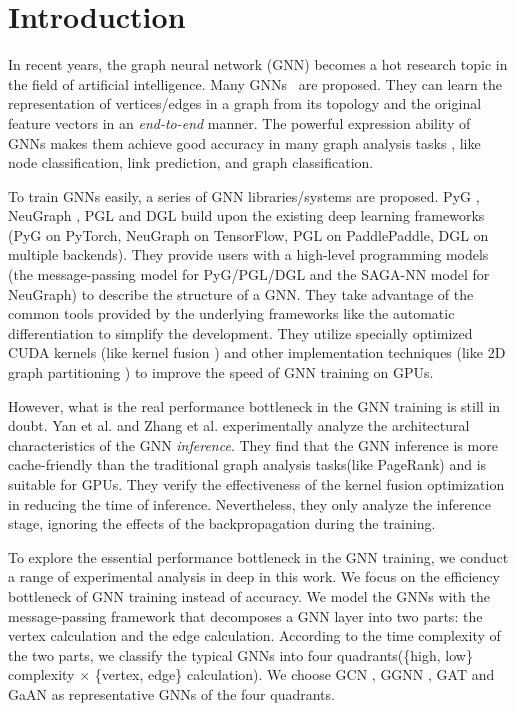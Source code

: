 \section{Introduction}
In recent years, the graph neural network (GNN) becomes a hot research topic in the field of artificial intelligence.
Many GNNs~\cite{kipf2017_gcn, defferrad2016_chebnet, li2018_agcn,li2015_ggnn, hamilton2017_graphsage, huang2018_gat, zhang2018_gaan} are proposed.
They can learn the representation of vertices/edges in a graph from its topology and the original feature vectors in an \emph{end-to-end} manner.
The powerful expression ability of GNNs makes them achieve good accuracy in many graph analysis tasks \cite{zhou2018_gnn_review, zhang2018_gnn_survey, comprehensive-survey-wu-2020}, like node classification, link prediction, and graph classification.

To train GNNs easily, a series of GNN libraries/systems \cite{PyG, DGL, ma2019_neugraph, zhu2019_aligraph, PGL} are proposed.
PyG \cite{PyG}, NeuGraph \cite{ma2019_neugraph}, PGL \cite{PGL} and DGL \cite{DGL} build upon the existing deep learning frameworks (PyG on PyTorch, NeuGraph on TensorFlow, PGL on PaddlePaddle, DGL on multiple backends).
They provide users with a high-level programming models (the message-passing model for PyG/PGL/DGL and the SAGA-NN model for NeuGraph) to describe the structure of a GNN.
They take advantage of the common tools provided by the underlying frameworks like the automatic differentiation to simplify the development.
They utilize specially optimized CUDA kernels (like kernel fusion \cite{DGL} \cite{ma2019_neugraph}) and other implementation techniques (like 2D graph partitioning \cite{ma2019_neugraph}) to improve the speed of GNN training on GPUs.

However, what is the real performance bottleneck in the GNN training is still in doubt.
Yan et al. \cite{yan2020_characterizing_gcn} and Zhang et al. \cite{zhang2020_analysis_neugraph} experimentally analyze the architectural characteristics of the GNN \emph{inference}.
They find that the GNN inference is more cache-friendly than the traditional graph analysis tasks(like PageRank) and is suitable for GPUs.
They verify the effectiveness of the kernel fusion optimization in reducing the time of inference.
Nevertheless, they only analyze the inference stage, ignoring the effects of the backpropagation during the training.

To explore the essential performance bottleneck in the GNN training, we conduct a range of experimental analysis in deep in this work. 
We focus on the efficiency bottleneck of GNN training instead of accuracy. 
We model the GNNs with the message-passing framework that decomposes a GNN layer into two parts: the vertex calculation and the edge calculation.  
According to the time complexity of the two parts, we classify the typical GNNs into four quadrants(\{high, low\} complexity $\times$ \{vertex, edge\} calculation).
We choose GCN \cite{kipf2017_gcn}, GGNN \cite{li2015_ggnn}, GAT \cite{huang2018_gat} and GaAN \cite{zhang2018_gaan} as representative GNNs of the four quadrants.

